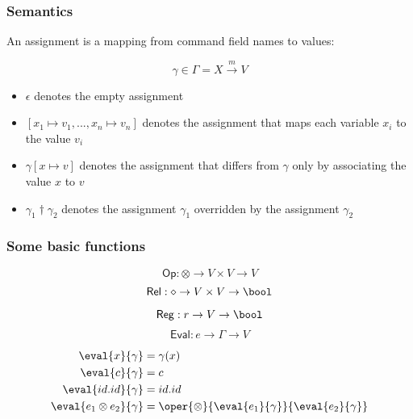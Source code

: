 
\begin{frame}
  \frametitle{Semantics} \small

\begin{definition}[Assignments]

An assignment is a mapping from command field names to values:

\[
\gamma \in \Gamma = X \stackrel{m}{\rightarrow} V
\]

\begin{itemize}
    \item $\epsilon$ denotes the empty assignment
    \item $[ x_1 \mapsto v_1,...,x_n \mapsto v_n ]$ denotes the assignment that maps each variable $x_i$ to the value $v_i$
    \item $\gamma [ x \mapsto v ]$ denotes the assignment that differs from $\gamma$ only by associating the value $x$ to $v$
    \item $\gamma_1 \dagger \gamma_2$ denotes the assignment $\gamma_1$ overridden by the assignment $\gamma_2$
\end{itemize}

\end{definition}

\end{frame}

\begin{frame}
  \frametitle{Some basic functions} \small

\[
\mathsf{Op}: \otimes \rightarrow V \times V \rightarrow V
\]
\[
\mathsf{Rel}: \diamond \rightarrow V \times V \rightarrow \bool
\]
\[
\mathsf{Reg}: r \rightarrow V \rightarrow \bool
\]
\[
\mathsf{Eval}: e \rightarrow \Gamma \rightarrow V
\]

\begin{align*}
\eval{x}{\gamma} &= \gamma(x) \\
\eval{c}{\gamma} &= c\\
\eval{id.id}{\gamma} &= id.id\\
\eval{e_1 \otimes e_2}{\gamma} &= \oper{\otimes}{\eval{e_1}{\gamma}}{\eval{e_2}{\gamma}}
\end{align*}

\end{frame}


